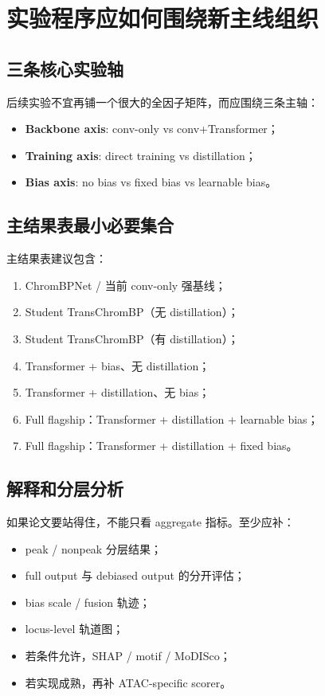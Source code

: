 \documentclass[11pt,a4paper]{ctexart}
\begin{document}
\section{实验程序应如何围绕新主线组织}

\subsection{三条核心实验轴}

后续实验不宜再铺一个很大的全因子矩阵，而应围绕三条主轴：
\begin{itemize}[leftmargin=2em]
  \item \textbf{Backbone axis}: conv-only vs conv+Transformer；
  \item \textbf{Training axis}: direct training vs distillation；
  \item \textbf{Bias axis}: no bias vs fixed bias vs learnable bias。
\end{itemize}

\subsection{主结果表最小必要集合}

主结果表建议包含：
\begin{enumerate}[leftmargin=2em]
  \item ChromBPNet / 当前 conv-only 强基线；
  \item Student TransChromBP（无 distillation）；
  \item Student TransChromBP（有 distillation）；
  \item Transformer + bias、无 distillation；
  \item Transformer + distillation、无 bias；
  \item Full flagship：Transformer + distillation + learnable bias；
  \item Full flagship：Transformer + distillation + fixed bias。
\end{enumerate}

\subsection{解释和分层分析}

如果论文要站得住，不能只看 aggregate 指标。至少应补：
\begin{itemize}[leftmargin=2em]
  \item peak / nonpeak 分层结果；
  \item full output 与 debiased output 的分开评估；
  \item bias scale / fusion 轨迹；
  \item locus-level 轨道图；
  \item 若条件允许，SHAP / motif / MoDISco；
  \item 若实现成熟，再补 ATAC-specific scorer。
\end{itemize}
\end{document}
